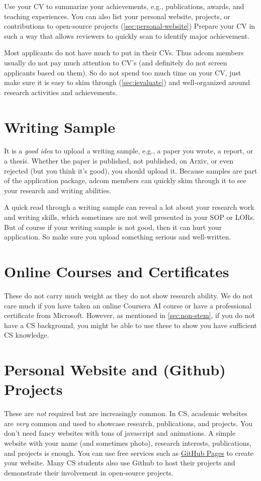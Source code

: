 \documentclass[oneside,11pt]{book}
\newenvironment{commentbox}[1][]{
  \small
  \begin{marker}[\faChessPawn{}]
    {\textbf{#1}}
  }{
  \end{marker}
}
\begin{document}
Use your CV to summarize your achievements, e.g., publications, awards, and teaching experiences. You can also list your personal website, projects, or contributions to open-source projects (\autoref{sec:personal-website}) 
Prepare your CV in such a way that allows reviewers to quickly scan to identify major achievement.  

\begin{commentbox}
    Most applicants do not have much to put in their CVs. Thus adcom members usually do not pay much attention to CV's (and definitely do not screen applicants based on them). So do not spend too much time on your CV, just make sure it is easy to skim through (\autoref{sec:ievaluate}) and well-organized around research activities and achievements.
\end{commentbox}

\section{Writing Sample}\label{sec:writing-sample}
It is a \emph{good idea} to upload a writing sample, e.g., a paper you wrote, a report, or a thesis.  Whether the paper is published, not published, on Arxiv, or even rejected (but you think it's good), you should upload it. Because samples are part of the application package, adcom members can quickly skim through it to see your research and writing abilities.  

A quick read through a writing sample can reveal a lot about your research work and writing skills, which sometimes are not well presented in your SOP or LORs. But of course if your writing sample is not good, then it can hurt your application. So make sure you upload something serious and well-written.

\section{Online Courses and Certificates}

These do not carry much weight as they do not show research ability. We do not care much if you have taken an online Coursera AI course or have a professional certificate from Microsoft.
However, as mentioned in \autoref{sec:non-stem}, if you do not have a CS background, you might be able to use these to show you have sufficient CS knowledge.

\section{Personal Website and (Github) Projects}\label{sec:personal-website}
These are \emph{not} required but are increasingly common.  In CS, academic websites are \emph{very} common and used to showcase research, publications, and projects.  You don't need fancy websites with tons of javascript and animations. A simple website with your name (and sometimes photo), research interests, publications, and projects is enough. You can use free services such as \href{https://github.io}{GitHub Pages} to create your website. Many CS students also use Github to host their projects and demonstrate their involvement in open-source projects.  
\end{document}
